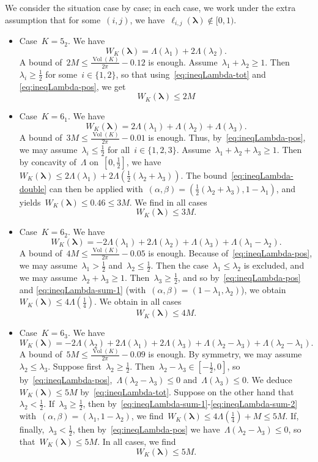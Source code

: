 \documentclass[11pt]{amsart}
\newcommand{\lambdab}{{\boldsymbol \lambda}}
\theoremstyle{definition}
\DeclareMathOperator{\Vol}{Vol}
\newcommand{\1}{{\mathbf 1}}
\numberwithin{equation}{section}
\begin{document}
We consider the situation case by case; in each case, we work under the extra assumption that for some~$(i, j)$, we have~$\ell_{i,j}(\lambdab) \not\in[0, 1)$.
\begin{itemize}
\item Case~$K = 5_2$. We have
  $$ W_K(\lambdab) = \Lambda(\lambda_1) +  2\Lambda(\lambda_2). $$
  A bound of~$2M \leq \frac{\Vol(K)}{2\pi} - 0.12$ is enough. Assume~$\lambda_1 + \lambda_2 \geq 1$. Then~$\lambda_i \geq \frac12$ for some~$i\in\{1, 2\}$, so that using~\eqref{eq:ineqLambda-tot} and \eqref{eq:ineqLambda-pos}, we get
  $$ W_K(\lambdab) \leq 2M $$

\item Case~$K = 6_1$. We have
  $$ W_K(\lambdab) = 2\Lambda(\lambda_1) + \Lambda(\lambda_2) + \Lambda(\lambda_3). $$
  A bound of~$3M \leq \frac{\Vol(K)}{2\pi} - 0.01$ is enough. Thus, by~\eqref{eq:ineqLambda-pos}, we may assume~$\lambda_i\leq \frac12$ for all~$i\in\{1, 2, 3\}$. Assume~$\lambda_1 + \lambda_2 + \lambda_3 \geq 1$. Then by concavity of~$\Lambda$ on~$[0, \frac12]$, we have~$W_K(\lambdab) \leq 2\Lambda(\lambda_1) + 2\Lambda(\frac12(\lambda_2 + \lambda_3))$. The bound~\eqref{eq:ineqLambda-double} can then be applied with~$(\alpha,\beta) = (\frac12(\lambda_2 + \lambda_3), 1-\lambda_1)$, and yields~$W_K(\lambdab) \leq 0.46 \leq 3M$. We find in all cases
  $$ W_K(\lambdab) \leq 3M. $$

\item Case~$K = 6_2$. We have
  $$ W_K(\lambdab) = -2\Lambda(\lambda_1) + 2\Lambda(\lambda_2) + \Lambda(\lambda_3) + \Lambda(\lambda_1 - \lambda_2). $$
  A bound of~$4M \leq \frac{\Vol(K)}{2\pi} - 0.05$ is enough. Because of~\eqref{eq:ineqLambda-pos}, we may assume~$\lambda_1>\frac12$ and~$\lambda_2 \leq \frac12$. Then the case~$\lambda_1 \leq \lambda_2$ is excluded, and we may assume~$\lambda_2 + \lambda_3 \geq 1$. Then~$\lambda_3 \geq \frac12$, and so by~\eqref{eq:ineqLambda-pos} and \eqref{eq:ineqLambda-sum-1} (with~$(\alpha, \beta) = (1-\lambda_1, \lambda_2)$), we obtain~$W_K(\lambdab) \leq 4\Lambda(\frac14)$. We obtain in all cases
  $$ W_K(\lambdab) \leq 4M. $$

\item Case~$K = 6_3$. We have
  $$ W_K(\lambdab) = -2\Lambda(\lambda_2) + 2\Lambda(\lambda_1) + 2\Lambda(\lambda_3) + \Lambda(\lambda_2-\lambda_3) + \Lambda(\lambda_2-\lambda_1). $$
  A bound of~$5M \leq \frac{\Vol(K)}{2\pi} - 0.09$ is enough.
By symmetry, we may assume~$\lambda_2 \leq \lambda_3$.  Suppose first~$\lambda_2\geq \frac12$. Then~$\lambda_2-\lambda_3 \in [-\frac12, 0]$, so by~\eqref{eq:ineqLambda-pos},~$\Lambda(\lambda_2-\lambda_3) \leq 0$ and~$\Lambda(\lambda_3)\leq 0$. We deduce~$W_K(\lambdab) \leq 5M$ by~\eqref{eq:ineqLambda-tot}. Suppose on the other hand that~$\lambda_2 < \frac12$. If~$\lambda_3\geq \frac12$, then by~\eqref{eq:ineqLambda-sum-1}-\eqref{eq:ineqLambda-sum-2} with~$(\alpha, \beta) = (\lambda_1, 1-\lambda_2)$, we find~$W_K(\lambdab) \leq 4\Lambda(\frac14) + M \leq 5M$. If, finally,~$\lambda_3 < \frac12$, then by~\eqref{eq:ineqLambda-pos} we have~$\Lambda(\lambda_2 - \lambda_3) \leq 0$, so that~$W_K(\lambdab) \leq 5M$. In all cases, we find
  $$ W_K(\lambdab) \leq 5M. $$


\end{itemize}
\end{document}

